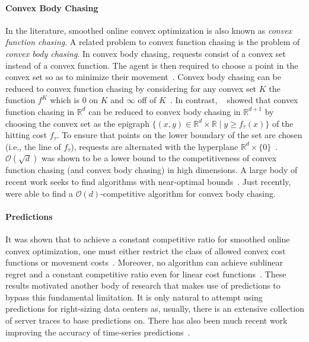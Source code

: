 \paragraph{Convex Body Chasing} In the literature, smoothed online convex optimization is also known as \emph{convex function chasing}. A related problem to convex function chasing is the problem of \emph{convex body chasing}. In convex body chasing, requests consist of a convex set instead of a convex function. The agent is then required to choose a point in the convex set so as to minimize their movement~\cite{Antoniadis2016}. Convex body chasing can be reduced to convex function chasing by considering for any convex set $K$ the function $f^K$ which is 0 on $K$ and $\infty$ off of $K$~\cite{Sellke2019}. In contrast,  \citeauthor*{Sellke2019}~\cite{Sellke2019} showed that convex function chasing in $\mathbb{R}^d$ can be reduced to convex body chasing in $\mathbb{R}^{d+1}$ by choosing the convex set as the epigraph $\{(x,y) \in \mathbb{R}^d \times \mathbb{R} \mid y \geq f_{\tau}(x)\}$ of the hitting cost $f_{\tau}$. To ensure that points on the lower boundary of the set are chosen (i.e., the line of $f_{\tau}$), requests are alternated with the hyperplane $\mathbb{R}^d \times \{0\}$~\cite{Sellke2019}. $\mathcal{O}(\sqrt{d})$ was shown to be a lower bound to the competitiveness of convex function chasing (and convex body chasing) in high dimensions. A large body of recent work seeks to find algorithms with near-optimal bounds~\cite{Bansal2017, Bubeck2018, Bubeck2018_2, Argue2019_2, Argue2019, Argue2020, Bubeck2020}. Just recently, \citeauthor*{Argue2019}~\cite{Argue2019} were able to find a $\mathcal{O}(d)$-competitive algorithm for convex body chasing.

\paragraph{Predictions} It was shown that to achieve a constant competitive ratio for smoothed online convex optimization, one must either restrict the class of allowed convex cost functions or movement costs~\cite{Chen2018}. Moreover, no algorithm can achieve sublinear regret and a constant competitive ratio even for linear cost functions~\cite{Andrew2015}. These results motivated another body of research that makes use of predictions to bypass this fundamental limitation. It is only natural to attempt using predictions for right-sizing data centers as, usually, there is an extensive collection of server traces to base predictions on. There has also been much recent work improving the accuracy of time-series predictions~\cite{Taylor2017, Benidis2020, Chen2020, Hosseini2021}.

